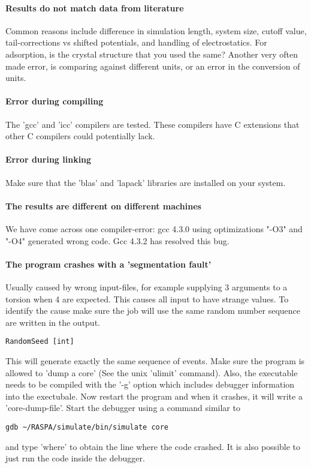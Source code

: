 \paragraph*{Results do not match data from literature}
Common reasons include difference in simulation length, system size, cutoff value, tail-corrections vs shifted potentials, 
and handling of electrostatics. For adsorption, is the crystal structure that you used the same?
Another very often made error, is comparing against different units, or an error in the conversion of units.

\paragraph*{Error during compiling}
The 'gcc' and 'icc' compilers are tested. These compilers have C extensions that other C compilers could potentially lack.

\paragraph*{Error during linking}
Make sure that the 'blas' and 'lapack' libraries are installed on your system.

\paragraph*{The results are different on different machines}
We have come across one compiler-error: gcc 4.3.0 using optimizations "-O3" and "-O4" generated wrong code. Gcc 4.3.2 has resolved this bug.

\paragraph*{The program crashes with a 'segmentation fault'}
Usually caused by wrong input-files, for example supplying 3 arguments to a torsion when 4 are expected. This
causes all input to have strange values. To identify the cause make sure the job will use
the same random number sequence are written in the output.
\begin{verbatim}
RandomSeed [int]
\end{verbatim}
This will generate exactly the same sequence of events.
Make sure the program is allowed to 'dump a core' (See the unix 'ulimit' command). Also, the executable
needs to be compiled with the '-g' option which includes debugger information into the exectubale.
Now restart the program and when it crashes, it will write a 'core-dump-file'. Start the debugger
using a command similar to
\begin{verbatim}
gdb ~/RASPA/simulate/bin/simulate core
\end{verbatim}
and type 'where' to obtain the line where the code crashed. It is also possible to just run the
code inside the debugger.

